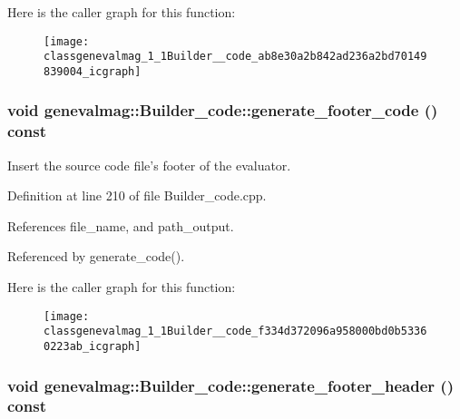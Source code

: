 Here is the caller graph for this function:\nopagebreak
\begin{figure}[H]
\begin{center}
\leavevmode
\texttt{[image: classgenevalmag\_1\_1Builder\_\_code\_ab8e30a2b842ad236a2bd70149839004\_icgraph]}
\end{center}
\end{figure}
\hypertarget{classgenevalmag_1_1Builder__code_f334d372096a958000bd0b53360223ab}{
\subsubsection[{generate\_\-footer\_\-code}]{\setlength{\rightskip}{0pt plus 5cm}void genevalmag::Builder\_\-code::generate\_\-footer\_\-code () const}}
\label{classgenevalmag_1_1Builder__code_f334d372096a958000bd0b53360223ab}


Insert the source code file's footer of the evaluator. 

Definition at line 210 of file Builder\_\-code.cpp.

References file\_\-name, and path\_\-output.

Referenced by generate\_\-code().

Here is the caller graph for this function:\nopagebreak
\begin{figure}[H]
\begin{center}
\leavevmode
\texttt{[image: classgenevalmag\_1\_1Builder\_\_code\_f334d372096a958000bd0b53360223ab\_icgraph]}
\end{center}
\end{figure}
\hypertarget{classgenevalmag_1_1Builder__code_5f3ad7619822680e0f2a79d7c26af776}{
\subsubsection[{generate\_\-footer\_\-header}]{\setlength{\rightskip}{0pt plus 5cm}void genevalmag::Builder\_\-code::generate\_\-footer\_\-header () const}}
\label{classgenevalmag_1_1Builder__code_5f3ad7619822680e0f2a79d7c26af776}



